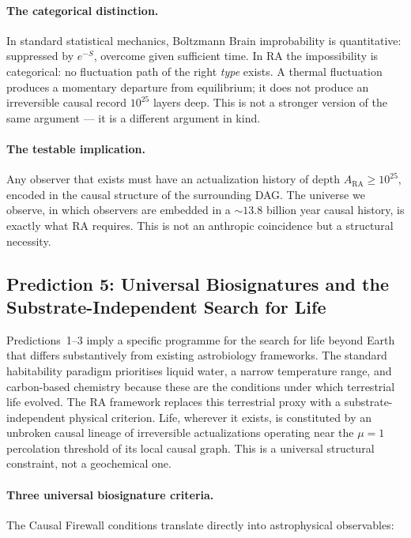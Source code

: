 \documentclass[11pt,a4paper]{article}
\theoremstyle{plain}
\theoremstyle{definition}
\theoremstyle{remark}
\newcommand{\ARA}{A_{\mathrm{RA}}}
\begin{document}
\paragraph{The categorical distinction.}
In standard statistical mechanics, Boltzmann Brain improbability is quantitative:
suppressed by $e^{-S}$, overcome given sufficient time. In RA the impossibility is
categorical: no fluctuation path of the right \emph{type} exists. A thermal
fluctuation produces a momentary departure from equilibrium; it does not produce an
irreversible causal record $10^{25}$ layers deep. This is not a stronger version
of the same argument --- it is a different argument in kind.

\paragraph{The testable implication.}
Any observer that exists must have an actualization history of depth $\ARA \geq
10^{25}$, encoded in the causal structure of the surrounding DAG. The universe we
observe, in which observers are embedded in a $\sim 13.8$ billion year causal
history, is exactly what RA requires. This is not an anthropic coincidence but a
structural necessity.

\subsection{Prediction 5: Universal Biosignatures and the Substrate-Independent
Search for Life}
\label{sec:prediction5}

Predictions~1--3 imply a specific programme for the search for life beyond
Earth that differs substantively from existing astrobiology frameworks. The
standard habitability paradigm prioritises liquid water, a narrow temperature
range, and carbon-based chemistry because these are the conditions under which
terrestrial life evolved. The RA framework replaces this terrestrial proxy
with a substrate-independent physical criterion. Life, wherever it exists, is
constituted by an unbroken causal lineage of irreversible actualizations
operating near the $\mu = 1$ percolation threshold of its local causal graph.
This is a universal structural constraint, not a geochemical one.

\paragraph{Three universal biosignature criteria.}
The Causal Firewall conditions translate directly into astrophysical observables:
\end{document}
